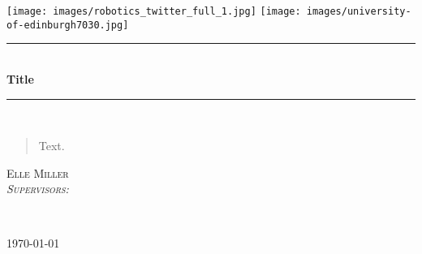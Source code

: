 \begin{titlepage}

\newcommand{\HRule}{\rule{\linewidth}{0.5mm}} 

\texttt{[image: images/robotics\_twitter\_full\_1.jpg]}
\hfill
\texttt{[image: images/university-of-edinburgh7030.jpg]}\\
[2cm]

\center 
{\small


\HRule \\[0.4cm]
{ \large \bfseries Title}\\[0.4cm] 
\HRule \\[2cm]

\begin{abstract}
    Text. 
\end{abstract}

\begin{minipage}{0.9\textwidth}
  \Large
  \centering
  \vspace{3cm}
  \textsc{Elle Miller}\\
  \vspace{20pt}
  \textsc{\small \textit{Supervisors:}}\\
\end{minipage}
~
\vspace{20pt}

{\large \today}\\[0.5cm]

}
\end{titlepage}
